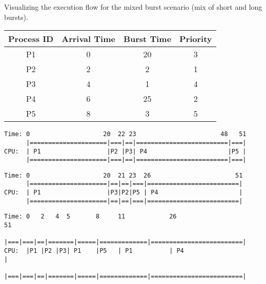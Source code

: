 \documentclass[12pt]{article}
\begin{document}
Visualizing the execution flow for the mixed burst scenario (mix of short and long bursts).

\begin{center}
\begin{tabular}{cccc}
\toprule
Process ID & Arrival Time & Burst Time & Priority \\
\midrule
 P1         & 0            & 20         & 3        \\
 P2         & 2            & 2          & 1        \\
 P3         & 4            & 1          & 4        \\
 P4         & 6            & 25         & 2        \\
 P5         & 8            & 3          & 5        \\
\bottomrule
\end{tabular}
\end{center}

\begin{lstlisting}[style=ganttstyle, caption={Gantt Chart: FCFS (burst\_mix.txt)}, label={lst:gantt_fcfs_burstmix}]
Time: 0                    20  22 23                       48   51
      |=====================|===|==|=========================|===|
CPU:  | P1                  |P2 |P3| P4                      |P5 |
      |=====================|===|==|=========================|===|
\end{lstlisting}

\begin{lstlisting}[style=ganttstyle, caption={Gantt Chart: SJF - Non-Preemptive (burst\_mix.txt)}, label={lst:gantt_sjfnp_burstmix}]
Time: 0                    20  21 23  26                       51
      |=====================|==|==|===|=========================|
CPU:  | P1                  |P3|P2|P5 | P4                      |
      |=====================|==|==|===|=========================|
\end{lstlisting}

\begin{lstlisting}[style=ganttstyle, caption={Gantt Chart: SRTF - Preemptive SJF (burst\_mix.txt)}, label={lst:gantt_srtf_burstmix}]
Time: 0   2   4  5       8     11            26                       51
      |===|===|==|=======|=====|=============|=========================|
CPU:  |P1 |P2 |P3| P1    |P5   | P1          | P4                      |
      |===|===|==|=======|=====|=============|=========================|
\end{lstlisting}
\end{document}
